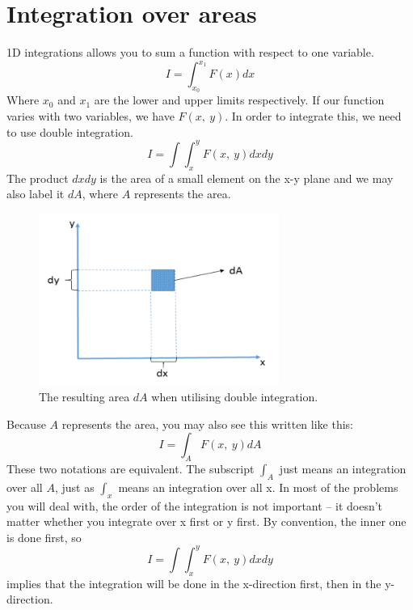 \documentclass[class=report, crop=false, 12pt,a4paper]{standalone}
\begin{document}
\section{Integration over areas}
1D integrations allows you to sum a function with respect to one variable.
\begin{equation}
  I = \int_{x_0}^{x_1} F(x) dx
\end{equation}
Where $x_0$ and $x_1$ are the lower and upper limits respectively. If our function varies with two variables, we have $F(x, \ y)$. In order to integrate this, we need to use double integration.
\begin{equation}
  I = \int \int_x^y F(x, \ y)dxdy
\end{equation}
The product $dxdy$ is the area of a small element on the x-y plane and we may also label it $dA$, where $A$ represents the area.
\begin{figure}
  \centering
  \includegraphics[width = 0.7\textwidth]{../img/doubleintegration}
  \caption{The resulting area $dA$ when utilising double integration.}
\end{figure}
Because $A$ represents the area, you may also see this written like this:
\begin{equation}
  I = \int_A F(x, \ y) dA
\end{equation}
These two notations are equivalent. The subscript $\int_A$ just means an integration over all $A$, just as $\int_x$ means an integration over all x.
In most of the problems you will deal with, the order of the integration is not important – it doesn’t matter whether you integrate over x first or y first.
By convention, the inner one is done first, so 
\begin{equation}
  I = \int \int_x^y F(x, \ y) dxdy
\end{equation}
implies that the integration will be done in the x-direction first, then in the y-direction.
\end{document}
